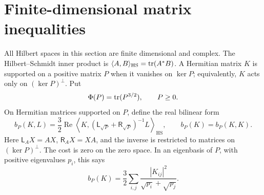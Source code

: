 \documentclass[11pt]{article}
\theoremstyle{remark}\newtheorem{remark}[theorem]{Remark}
\newcommand{\HS}{\mathrm{HS}}\newcommand{\Rea}{\operatorname{Re}}
\begin{document}
\section{Finite-dimensional matrix inequalities}\label{sec:matrix}
All Hilbert spaces in this section are finite dimensional and complex. The Hilbert--Schmidt inner product is $\langle A,B\rangle_{\HS}=\tr(A^*B)$. A Hermitian matrix $K$ is supported on a positive matrix $P$ when it vanishes on $\ker P$; equivalently, $K$ acts only on $(\ker P)^\perp$. Put
\[
 \Phi(P)=\operatorname{tr}(P^{3/2}),\qquad P\geq0.
\]
On Hermitian matrices supported on $P$, define the real bilinear form
\[
 b_P(K,L)=\frac32\Rea\left\langle K,
 (\mathsf L_{\sqrt P}+\mathsf R_{\sqrt P})^{-1}L\right\rangle_{\HS},
 \qquad b_P(K)=b_P(K,K).
\]
Here $\mathsf L_A X=AX$, $\mathsf R_A X=XA$, and the inverse is restricted to matrices on $(\ker P)^\perp$. The cost is zero on the zero space. In an eigenbasis of $P$, with positive eigenvalues $p_i$, this says
\[
 b_P(K)=\frac32\sum_{i,j}\frac{|K_{ij}|^2}{\sqrt{p_i}+\sqrt{p_j}}.
\]
\end{document}
